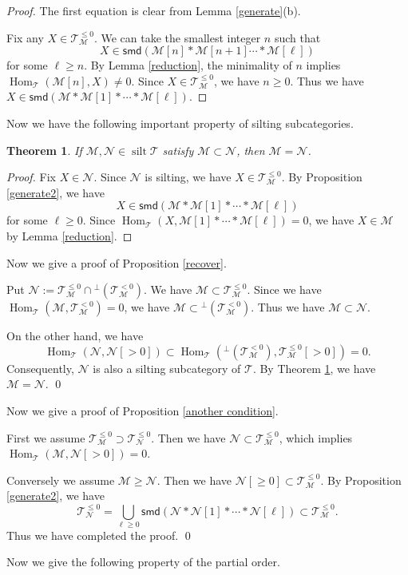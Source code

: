\documentclass[a4paper,reqno]{amsart}
\newtheorem{theorem}{Theorem}[section]
\theoremstyle{definition}
\newcommand{\TT}{{\mathcal T}}
\newcommand{\MM}{{\mathcal M}}
\newcommand{\NN}{{\mathcal N}}
\newcommand{\summand}{\mathsf{smd}}
\newcommand{\Hom}{\operatorname{Hom}\nolimits}
\newcommand{\silt}{\operatorname{silt}\nolimits}
\begin{document}
\begin{proof}
The first equation is clear from Lemma \ref{generate}(b).

Fix any $X\in\TT_{\MM}^{\le0}$. We can take the smallest integer $n$ such that
\[X\in\summand(\MM[n]*\MM[n+1]\cdots*\MM[\ell])\]
for some $\ell\ge n$. By Lemma \ref{reduction}, the minimality of $n$ implies
$\Hom_{\TT}(\MM[n],X)\neq0$.
Since $X\in\TT_{\MM}^{\le0}$, we have $n\ge0$.
Thus we have $X\in\summand(\MM*\MM[1]*\cdots*\MM[\ell])$.
\end{proof}

Now we have the following important property of silting subcategories.

\begin{theorem}\label{no inclusion}
If $\MM,\NN\in\silt\TT$ satisfy $\MM\subset\NN$, then $\MM=\NN$.
\end{theorem}

\begin{proof}
Fix $X\in\NN$. Since $\NN$ is silting, we have $X\in\TT_{\MM}^{\le0}$.
By Proposition \ref{generate2}, we have
\[X\in\summand(\MM*\MM[1]*\cdots*\MM[\ell])\]
for some $\ell\ge0$.
Since $\Hom_{\TT}(X,\MM[1]*\cdots*\MM[\ell])=0$, we have $X\in\MM$
by Lemma \ref{reduction}.
\end{proof}

Now we give a proof of Proposition \ref{recover}.

Put $\NN:=\TT_{\MM}^{\le0}\cap{}^\perp(\TT_{\MM}^{<0})$.
We have $\MM\subset\TT_{\MM}^{\le0}$.
Since we have $\Hom_{\TT}(\MM,\TT_{\MM}^{<0})=0$, we have
$\MM\subset{}^\perp(\TT_{\MM}^{<0})$.
Thus we have $\MM\subset\NN$.

On the other hand, we have
\[\Hom_{\TT}(\NN,\NN[>0])\subset\Hom_{\TT}({}^\perp(\TT_{\MM}^{<0}),\TT_{\MM}^{\le0}[>0])=0.\]
Consequently, $\NN$ is also a silting subcategory of $\TT$.
By Theorem \ref{no inclusion}, we have $\MM=\NN$.
\qed

\medskip
Now we give a proof of Proposition \ref{another condition}.

First we assume $\TT_{\MM}^{\le0}\supset\TT_{\NN}^{\le0}$. Then we have $\NN\subset\TT_{\MM}^{\le0}$,
which implies $\Hom_{\TT}(\MM,\NN[>0])=0$.

Conversely we assume $\MM\ge\NN$. Then we have $\NN[\ge0]\subset\TT_{\MM}^{\le0}$.
By Proposition \ref{generate2}, we have
\[\TT_{\NN}^{\le0}=\bigcup_{\ell\ge0}\summand(\NN*\NN[1]*\cdots*\NN[\ell])
\subset\TT_{\MM}^{\le0}.\]
Thus we have completed the proof.
\qed

\medskip
Now we give the following property of the partial order.
\end{document}
